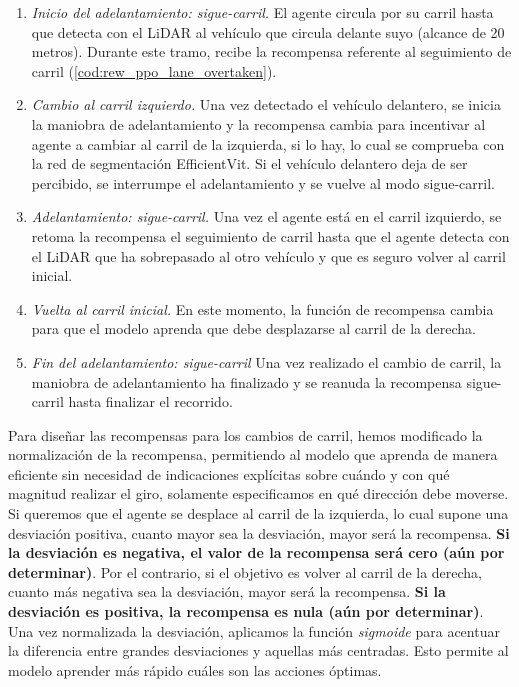 \begin{enumerate}
\item \textit{Inicio del adelantamiento: sigue-carril.} El agente circula por su carril hasta que detecta con el \ac{LiDAR} al vehículo que circula delante suyo (alcance de 20 metros). Durante este tramo, recibe la recompensa referente al seguimiento de carril (\ref{cod:rew_ppo_lane_overtaken}).
\item \textit{Cambio al carril izquierdo.} Una vez detectado el vehículo delantero, se inicia la maniobra de adelantamiento y la recompensa cambia para incentivar al agente a cambiar al carril de la izquierda, si lo hay, lo cual se comprueba con la red de segmentación EfficientVit. Si el vehículo delantero deja de ser percibido, se interrumpe el adelantamiento y se vuelve al modo sigue-carril.
\item \textit{Adelantamiento: sigue-carril.} Una vez el agente está en el carril izquierdo, se retoma la recompensa el seguimiento de carril hasta que el agente detecta con el \ac{LiDAR} que ha sobrepasado al otro vehículo y que es seguro volver al carril inicial.
\item \textit{Vuelta al carril inicial.} En este momento, la función de recompensa cambia para que el modelo aprenda que debe desplazarse al carril de la derecha.
\item \textit{Fin del adelantamiento: sigue-carril} Una vez realizado el cambio de carril, la maniobra de adelantamiento ha finalizado y se reanuda la recompensa sigue-carril hasta finalizar el recorrido.
\end{enumerate}

Para diseñar las recompensas para los cambios de carril, hemos modificado la normalización de la recompensa, permitiendo al modelo que aprenda de manera eficiente sin necesidad de indicaciones explícitas sobre cuándo y con qué magnitud realizar el giro, solamente especificamos en qué dirección debe moverse. Si queremos que el agente se desplace al carril de la izquierda, lo cual supone una desviación positiva, cuanto mayor sea la desviación, mayor será la recompensa. \textbf{Si la desviación es negativa, el valor de la recompensa será cero (aún por determinar)}. Por el contrario, si el objetivo es volver al carril de la derecha, cuanto más negativa sea la desviación, mayor será la recompensa. \textbf{Si la desviación es positiva, la recompensa es nula (aún por determinar)}. Una vez normalizada la desviación, aplicamos la función \textit{sigmoide} para acentuar la diferencia entre grandes desviaciones y aquellas más centradas. Esto permite al modelo aprender más rápido cuáles son las acciones óptimas. 

